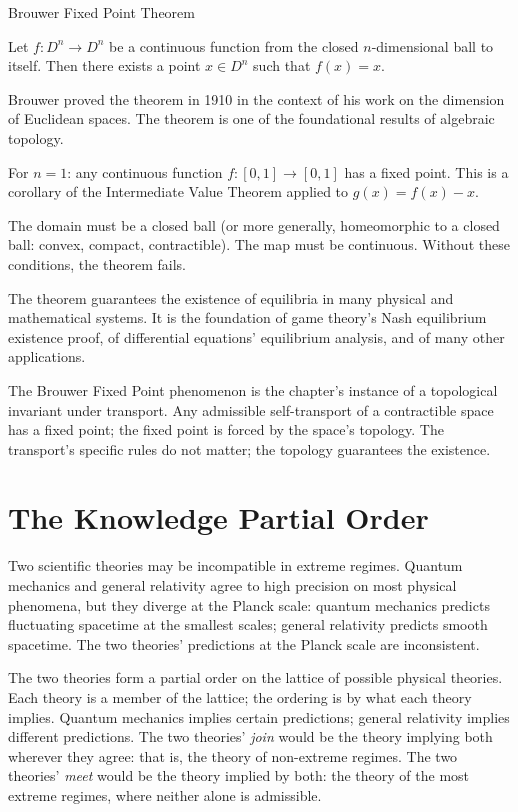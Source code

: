 \begin{phenom}{Brouwer Fixed Point Theorem}
\label{ph:brouwer-fixed-point}

\PhStatement Let $f : D^n \to D^n$ be a continuous function from the
closed $n$-dimensional ball to itself. Then there exists a point
$x \in D^n$ such that $f(x) = x$.

\PhOrigin Brouwer proved the theorem in 1910 in the context of his
work on the dimension of Euclidean spaces. The theorem is one of
the foundational results of algebraic topology.

\PhObservation For $n = 1$: any continuous function $f : [0, 1] \to
[0, 1]$ has a fixed point. This is a corollary of the
Intermediate Value Theorem applied to $g(x) = f(x) - x$.

\PhConstraint The domain must be a closed ball (or more generally,
homeomorphic to a closed ball: convex, compact, contractible).
The map must be continuous. Without these conditions, the theorem
fails.

\PhConsequence The theorem guarantees the existence of equilibria
in many physical and mathematical systems. It is the foundation
of game theory's Nash equilibrium existence proof, of
differential equations' equilibrium analysis, and of many other
applications.

\end{phenom}

The Brouwer Fixed Point phenomenon is the chapter's instance of a
topological invariant under transport. Any admissible
self-transport of a contractible space has a fixed point; the
fixed point is forced by the space's topology. The transport's
specific rules do not matter; the topology guarantees the
existence.

\section{The Knowledge Partial Order}
\label{se:the-knowledge-partial-order}

Two scientific theories may be incompatible in extreme regimes.
Quantum mechanics and general relativity agree to high precision on
most physical phenomena, but they diverge at the Planck scale:
quantum mechanics predicts fluctuating spacetime at the smallest
scales; general relativity predicts smooth spacetime. The two
theories' predictions at the Planck scale are inconsistent.

The two theories form a partial order on the lattice of possible
physical theories. Each theory is a member of the lattice; the
ordering is by what each theory implies. Quantum mechanics
implies certain predictions; general relativity implies different
predictions. The two theories' \emph{join} would be the theory
implying both wherever they agree: that is, the theory of
non-extreme regimes. The two theories' \emph{meet} would be the
theory implied by both: the theory of the most extreme regimes,
where neither alone is admissible.

